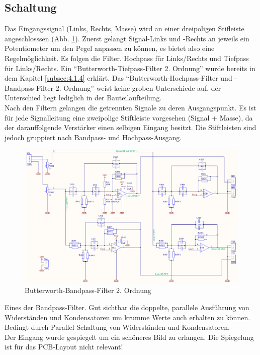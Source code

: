 \subsection{Schaltung}\label{subsec:4.3.4}
Das Eingangssignal (Links, Rechts, Masse) wird an einer dreipoligen Stifleiste angeschlosssen (Abb. \ref{fig:4.3.4.1}). Zuerst gelangt Signal-Links und -Rechts an jeweils ein Potentiometer um den Pegel anpassen zu können, es bietet also eine Regelmöglichkeit. Es folgen die Filter. Hochpass für Links/Rechts und Tiefpass für Links/Rechts. Ein \enquote{Butterworth-Tiefpass-Filter 2. Ordnung} wurde bereits in dem Kapitel \ref{subsec:4.1.4} erklärt. Das \enquote{Butterworth-Hochpass-Filter und -Bandpass-Filter 2. Ordnung} weist keine groben Unterschiede auf, der Unterschied liegt lediglich in der Bauteilaufteilung.\\
Nach den Filtern gelangen die getrennten Signale zu deren Ausgangspunkt. Es ist für jede Signalleitung eine zweipolige Stiftleiste vorgesehen (Signal + Masse), da der darauffolgende Verstärker einen selbigen Eingang besitzt. Die Stiftleisten sind jedoch gruppiert nach Bandpass- und Hochpass-Ausgang.\\
\begin{figure} [H]
	\centering	
	\includegraphics[width=1\textwidth]{img/Print4/4_TTuHTWeiche-Schematic.PNG}
	\caption{Butterworth-Bandpass-Filter 2. Ordnung}
	\label {fig:4.3.4.1}
\end{figure}
Eines der Bandpass-Filter. Gut sichtbar die doppelte, parallele Ausführung von Widerständen und Kondensatoren um krumme Werte auch erhalten zu können. Bedingt durch Parallel-Schaltung von Widerständen und Kondensatoren.\\ 
Der Eingang wurde gespiegelt um ein schöneres Bild zu erlangen. Die Spiegelung ist für das PCB-Layout nicht relevant!\\
